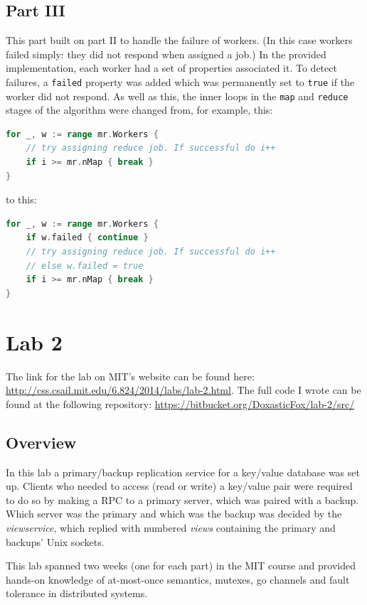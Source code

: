 \documentclass[11pt,a4paper]{report}
\begin{document}
	\subsection{Part III}
	This part built on part II to handle the failure of workers. (In this case workers failed simply: they did not respond when assigned a job.) In the provided implementation, each worker had a set of properties associated it. To detect failures, a \verb=failed= property was added which was permanently set to \verb=true= if the worker did not respond. As well as this, the inner loops in the \verb=map= and \verb=reduce= stages of the algorithm were changed from, for example, this:
	\begin{lstlisting}[language=go]
for _, w := range mr.Workers {
    // try assigning reduce job. If successful do i++
    if i >= mr.nMap { break }
}
	\end{lstlisting}
	to this:
	\begin{lstlisting}[language=go]
for _, w := range mr.Workers {
    if w.failed { continue }
    // try assigning reduce job. If successful do i++
    // else w.failed = true
    if i >= mr.nMap { break }
}
	\end{lstlisting}
	
	\section{Lab 2}
	The link for the lab on MIT's website can be found here: \url{http://css.csail.mit.edu/6.824/2014/labs/lab-2.html}.
	The full code I wrote can be found at the following repository: \url{https://bitbucket.org/DoxasticFox/lab-2/src/}
	
	\subsection{Overview}
	In this lab a primary/backup replication service for a key/value database was set up. Clients who needed to access (read or write) a key/value pair were required to do so by making a RPC to a primary server, which was paired with a backup. Which server was the primary and which was the backup was decided by the \textit{viewservice}, which replied with numbered \textit{views} containing the primary and backups' Unix sockets.
	
	This lab spanned two weeks (one for each part) in the MIT course and provided hands-on knowledge of at-most-once semantics, mutexes, go channels and fault tolerance in distributed systems.
	
\end{document}
